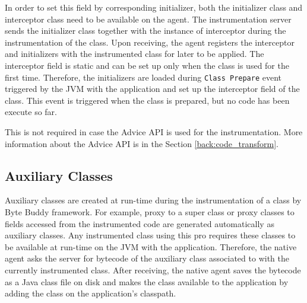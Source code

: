In order to set this field by corresponding initializer, both the initializer class and interceptor class need to be available on the agent. The instrumentation server sends the initializer class together with the instance of interceptor during the instrumentation of the class. Upon receiving, the agent registers the interceptor and initializers with the instrumented class for later to be applied. The interceptor field is static and can be set up only when the class is used for the first time. Therefore, the initializers are loaded during \texttt{Class Prepare} event triggered by the JVM with the application and set up the interceptor field of the class. This event is triggered when the class is prepared, but no code has been execute so far. 

This is not required in case the Advice API is used for the instrumentation. More information about the Advice API is in the Section \ref{back:code_transform}.

\subsection{Auxiliary Classes}
Auxiliary classes are created at run-time during the instrumentation of a class by Byte Buddy framework. For example, proxy to a super class or proxy classes to fields accessed from the instrumented code are generated automatically as auxiliary classes. Any instrumented class using this pro requires these classes to be available at run-time on the JVM with the application. Therefore, the native agent asks the server for bytecode of the auxiliary class associated to with the currently instrumented class. After receiving, the native agent saves the bytecode as a Java class file on disk and makes the class available to the application by adding the class on the application's classpath.

